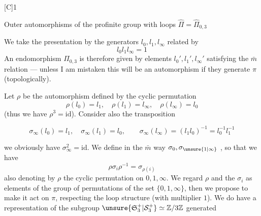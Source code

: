 [C]\qquad\textcircled{1}\qquad{}

Outer automorphisms of the profinite group with loops  $\hat\Pi=\hat\Pi_{0,3}$
\margin{$\unsure{\partial|\delta}$}

We take the presentation by the generators $l_0,l_1,l_\infty$ related by
\[
l_0l_1l_\infty=1
\]
An endomorphism  $\Pi_{0,3}$ is therefore given by elements $l_0',l_1',l_\infty'$ satisfying the $\bar m$ relation --- unless I am mistaken this will be an automorphism if they generate $\pi$ (topologically).

Let $\rho$ be the automorphism defined by the cyclic permutation
\[
\rho(l_0)=l_1,\quad\rho(l_1)=l_\infty,\quad\rho(l_\infty)=l_0
\]
(thus we have $\rho^3=\mathrm{id}$). Consider also the transposition

\[
\sigma_\infty(l_0)=l_1,\quad\sigma_\infty(l_1)=l_0,\qquad
\sigma_\infty(l_\infty)=(l_1l_0)^{-1}=l_0^{-1}l_1^{-1}
\]

we obviously have $\sigma_\infty^2=\mathrm{id}$. We define in the $\bar m$ way $\sigma_0,\sigma_{\unsure{1|\infty}}$ , so that we have
\[
\rho\sigma_i\rho^{-1}=\sigma_{\rho(i)}
\]
also denoting by $\rho$ the cyclic permutation on $0,1,\infty$. We regard $\rho$ and the $\sigma_i$ as elements of the group  of permutations of the set $\{0,1,\infty\}$, then we propose to make it act on $\pi$, respecting the loop structure (with multiplier  $1$). We do have a  representation of the subgroup $\unsure{\mathfrak S_3^+|\mathcal S_3^+}\simeq\mathbb Z/3\mathbb Z$ generated
